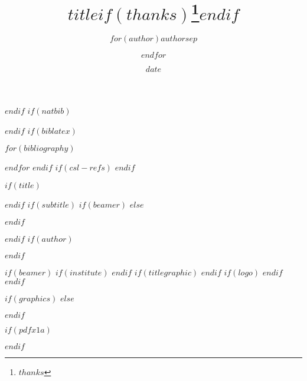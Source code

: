 \fi
{}\fi{} %
  \newcommand{\RL}[1]{\beginR #1\endR}
  \newcommand{\LR}[1]{\beginL #1\endL}
  \newenvironment{RTL}{\beginR}{\endR}
  \newenvironment{LTR}{\beginL}{\endL}
\fi
$endif$
$if(natbib)$
\usepackage[$natbiboptions$]{natbib}

$endif$
$if(biblatex)$
\usepackage[$if(biblio-style)$style=$biblio-style$,$endif$$for(biblatexoptions)$$biblatexoptions$$sep$,$endfor$]{biblatex}
$for(bibliography)$

$endfor$
$endif$
$if(csl-refs)$
\newlength{\cslhangindent}
\setlength{\cslhangindent}{1.5em}
\newenvironment{cslreferences}%
  {$if(csl-hanging-indent)$\setlength{\parindent}{0pt}%
  \everypar{\setlength{\hangindent}{\cslhangindent}}\ignorespaces$endif$}%
  {\par}
$endif$

$if(title)$
\title{$title$$if(thanks)$\thanks{$thanks$}$endif$}
$endif$
$if(subtitle)$
$if(beamer)$
$else$
\usepackage{etoolbox}
\makeatletter
\providecommand{\subtitle}[1]{%
  \apptocmd{\@title}{\par {\large #1 \par}}{}{}
}
\makeatother
$endif$
\subtitle{$subtitle$}
$endif$
$if(author)$
\author{$for(author)$$author$$sep$ \and $endfor$}
$endif$
\date{$date$}
$if(beamer)$
$if(institute)$
$endif$
$if(titlegraphic)$
$endif$
$if(logo)$
$endif$
$endif$

\usepackage{ascmac}


$if(graphics)$
$else$
\usepackage[dvipdfmx,hiresbb]{graphicx}
$endif$

\usepackage{booktabs}

$if(pdfx1a)$
\usepackage[x-1a1]{pdfx}
$endif$

\usepackage[]{titlesec}

\renewcommand{\jsParagraphMark}{}

